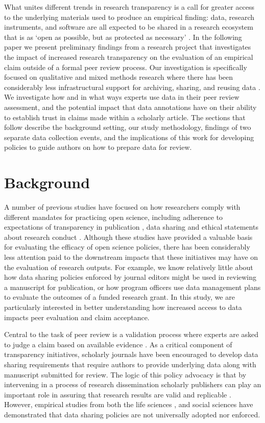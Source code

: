 \documentclass[sigchi]{acmart}
\begin{document}
What unites different trends in research transparency is a call for greater access to the underlying materials used to produce an empirical finding: data, research instruments, and  software are all expected to be shared in a research ecosystem that is as ‘open as possible, but as protected as necessary’ \cite{wilkinson2016fair}. In the following paper we present preliminary findings from a research project that investigates the impact of increased research transparency on the evaluation of an empirical claim outside of a formal peer review process. Our investigation is specifically focused on qualitative and mixed methods research where there has been considerably less infrastructural support for archiving, sharing, and reusing data \cite{elman2014data}. We investigate how and in what ways experts use  data in their peer review assessment, and the potential impact that data annotations have on their ability to establish trust in claims made within a scholarly article. The sections that follow describe the background setting, our study methodology,  findings of two separate data collection events, and the implications of this work for developing policies to guide authors on how to prepare data for review.

\section{Background} 
A number of previous studies have focused on how researchers comply with different mandates for practicing open science, including adherence to expectations of transparency in publication \cite{tong2012enhancing}, data sharing \cite{peat2014improving}  and ethical statements about research conduct \cite{anderson2013ethical}. Although these studies have provided a valuable basis for evaluating the efficacy of open science policies, there has been considerably less attention paid to the downstream impacts that these initiatives may have on the evaluation of research outputs. For example, we know relatively little about how data sharing policies enforced by journal editors might be used in reviewing a manuscript for publication, or how program officers use data management plans to evaluate the outcomes of a funded research grant. In this study, we are particularly interested in better understanding how increased access to data impacts peer evaluation and claim acceptance. 

Central to the task of peer review is a validation process where experts are asked to judge a claim based on available evidence \cite{spier2002history}. As a critical component of transparency initiatives, scholarly journals have been encouraged to develop data sharing requirements \cite{schofield2009post, sturges2015research} that require authors to provide underlying data along with manuscript submitted for review. The logic of this policy advocacy is that by intervening in a process of research dissemination scholarly publishers can play an important role in assuring that research results are valid and replicable . However, empirical studies from both the life sciences \cite{vasilevsky2017reproducible,thelwall2017journal}, and social sciences \cite{crosas_data_2018} have demonstrated that data sharing policies are not universally adopted nor enforced. 
\end{document}
